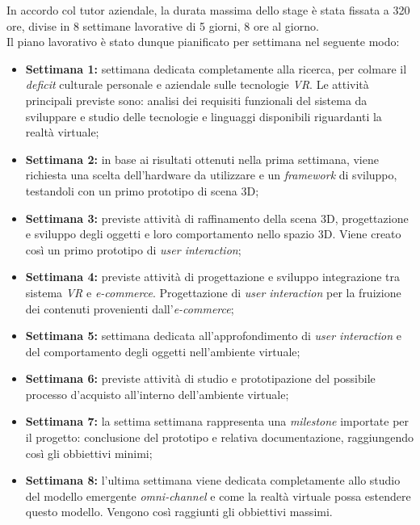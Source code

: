 In accordo col tutor aziendale, la durata massima dello stage è stata fissata a 320 ore, divise in 8 settimane lavorative di 5 giorni, 8 ore al giorno. \\
Il piano lavorativo è stato dunque pianificato per settimana nel seguente modo:

\begin{itemize}
	\item \textbf{Settimana 1:} settimana dedicata completamente alla ricerca, per colmare il \textit{deficit} culturale personale e aziendale sulle tecnologie \textit{VR}. Le attività principali previste sono: analisi dei requisiti funzionali del sistema da sviluppare e studio delle tecnologie e linguaggi disponibili riguardanti la realtà virtuale;
	
	\item \textbf{Settimana 2:} in base ai risultati ottenuti nella prima settimana, viene richiesta una scelta dell'hardware da utilizzare e un \textit{framework} di sviluppo, testandoli con un primo prototipo di scena 3D;
	
	\item \textbf{Settimana 3:} previste attività di raffinamento della scena 3D, progettazione e sviluppo degli oggetti e loro comportamento nello spazio 3D. Viene creato così un primo prototipo di \textit{user interaction};
	
	\item \textbf{Settimana 4:} previste attività di progettazione e sviluppo integrazione tra sistema \textit{VR} e \textit{e-commerce}. Progettazione di \textit{user interaction} per la fruizione dei contenuti provenienti dall'\textit{e-commerce};
	
	\item \textbf{Settimana 5:} settimana dedicata all'approfondimento di \textit{user interaction} e del comportamento degli oggetti nell'ambiente virtuale;
	
	\item \textbf{Settimana 6:} previste attività di studio e prototipazione del possibile processo d'acquisto all'interno dell'ambiente virtuale;
	
	\item \textbf{Settimana 7:} la settima settimana rappresenta una \textit{milestone} importate per il progetto: conclusione del prototipo e relativa documentazione, raggiungendo così gli obbiettivi minimi;
	
	\item \textbf{Settimana 8:} l'ultima settimana viene dedicata completamente allo studio del modello emergente \textit{omni-channel} e come la realtà virtuale possa estendere questo modello. Vengono così raggiunti gli obbiettivi massimi.
\end{itemize}

